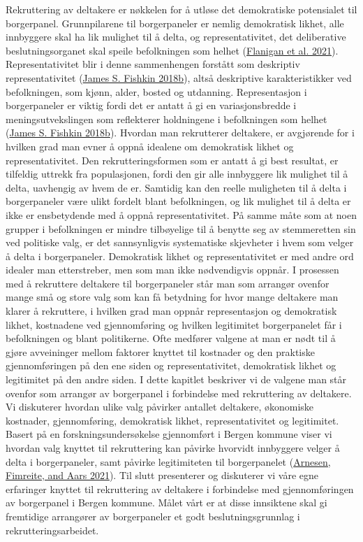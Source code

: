 \documentclass[
  12pt,
  a4paper, 12pt]{article}
\begin{document}
Rekruttering av deltakere er nøkkelen for å utløse det demokratiske potensialet til borgerpanel. Grunnpilarene til borgerpaneler er nemlig demokratisk likhet, alle innbyggere skal ha lik mulighet til å delta, og representativitet, det deliberative beslutningsorganet skal speile befolkningen som helhet (\protect\hyperlink{ref-flanigan_fair_2021}{Flanigan et al. 2021}). Representativitet blir i denne sammenhengen forstått som deskriptiv representativitet (\protect\hyperlink{ref-fishkin_democracy_2018}{James S. Fishkin 2018b}), altså deskriptive karakteristikker ved befolkningen, som kjønn, alder, bosted og utdanning. Representasjon i borgerpaneler er viktig fordi det er antatt å gi en variasjonsbredde i meningsutvekslingen som reflekterer holdningene i befolkningen som helhet (\protect\hyperlink{ref-fishkin_democracy_2018}{James S. Fishkin 2018b}).
Hvordan man rekrutterer deltakere, er avgjørende for i hvilken grad man evner å oppnå idealene om demokratisk likhet og representativitet. Den rekrutteringsformen som er antatt å gi best resultat, er tilfeldig uttrekk fra populasjonen, fordi den gir alle innbyggere lik mulighet til å delta, uavhengig av hvem de er. Samtidig kan den reelle muligheten til å delta i borgerpaneler være ulikt fordelt blant befolkningen, og lik mulighet til å delta er ikke er ensbetydende med å oppnå representativitet. På samme måte som at noen grupper i befolkningen er mindre tilbøyelige til å benytte seg av stemmeretten sin ved politiske valg, er det sannsynligvis systematiske skjevheter i hvem som velger å delta i borgerpaneler. Demokratisk likhet og representativitet er med andre ord idealer man etterstreber, men som man ikke nødvendigvis oppnår.
I prosessen med å rekruttere deltakere til borgerpaneler står man som arrangør ovenfor mange små og store valg som kan få betydning for hvor mange deltakere man klarer å rekruttere, i hvilken grad man oppnår representasjon og demokratisk likhet, kostnadene ved gjennomføring og hvilken legitimitet borgerpanelet får i befolkningen og blant politikerne. Ofte medfører valgene at man er nødt til å gjøre avveininger mellom faktorer knyttet til kostnader og den praktiske gjennomføringen på den ene siden og representativitet, demokratisk likhet og legitimitet på den andre siden.
I dette kapitlet beskriver vi de valgene man står ovenfor som arrangør av borgerpanel i forbindelse med rekruttering av deltakere. Vi diskuterer hvordan ulike valg påvirker antallet deltakere, økonomiske kostnader, gjennomføring, demokratisk likhet, representativitet og legitimitet. Basert på en forskningsundersøkelse gjennomført i Bergen kommune viser vi hvordan valg knyttet til rekruttering kan påvirke hvorvidt innbyggere velger å delta i borgerpaneler, samt påvirke legitimiteten til borgerpanelet (\protect\hyperlink{ref-arnesenloddet}{Arnesen, Fimreite, and Aars 2021}). Til slutt presenterer og diskuterer vi våre egne erfaringer knyttet til rekruttering av deltakere i forbindelse med gjennomføringen av borgerpanel i Bergen kommune. Målet vårt er at disse innsiktene skal gi fremtidige arrangører av borgerpaneler et godt beslutningsgrunnlag i rekrutteringsarbeidet.
\end{document}
